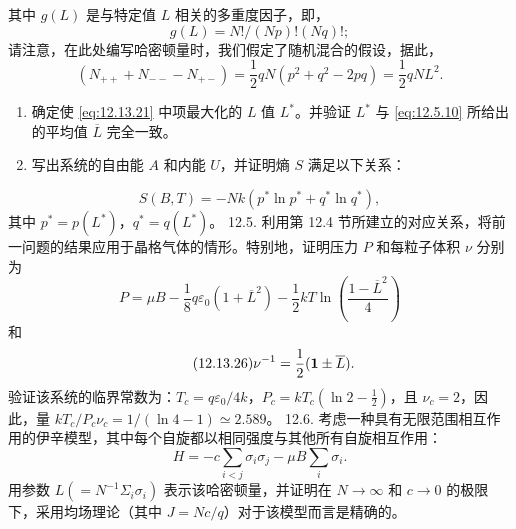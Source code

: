 其中 \(g(L)\) 是与特定值 \(L\) 相关的多重度因子，即，
\begin{equation}\tag{12.13.22}\label{eq:12.13.22}
g ( L ) = N ! / ( N p ) ! ( N q ) ! ;
\end{equation}
请注意，在此处编写哈密顿量时，我们假定了随机混合的假设，据此，
\begin{equation}\tag{12.13.23}\label{eq:12.13.23}
( N _ { + + } + N _ { -- } - N _ { + - } ) = \frac { 1 } { 2 } q N ( p ^{2} + q ^{2} - 2 p q ) = \frac { 1 } { 2 } q N L ^{2} .
\end{equation}
\begin{enumerate}
\def\labelenumi{(\alph{enumi})}
\item
  确定使 \autoref{eq:12.13.21} 中项最大化的 \(L\) 值 \(L^{*}\)。并验证 \(L^{*}\) 与 \autoref{eq:12.5.10} 所给出的平均值 \(\overline{L}\) 完全一致。
\item
  写出系统的自由能 \(A\) 和内能 \(U\)，并证明熵 \(S\) 满足以下关系：
\end{enumerate}
\begin{equation}\tag{12.13.24}\label{eq:12.13.24}
S ( B , T ) = - N k ( p ^{*} \ln p ^{*} + q ^{*} \ln q ^{*} ) ,
\end{equation}
其中 \(p^{*}=p(L^{*})\)，\(q^{*}=q(L^{*})\)。
12.5. 利用第 12.4 节所建立的对应关系，将前一问题的结果应用于晶格气体的情形。特别地，证明压力 \(P\) 和每粒子体积 \(\nu\) 分别为
\begin{equation}\tag{12.13.25}\label{eq:12.13.25}
P = \mu B - \frac { 1 } { 8 } q \varepsilon _ { 0 } \left( 1 + \overline { { { L } } } ^{2} \right) - \frac { 1 } { 2 } k T \ln \left( \frac { 1 - \overline { { { L } } } ^{2} } { 4 } \right)
\end{equation}
和
\begin{equation}\tag{12.13.26}\label{eq:12.13.26}
\nu ^{- 1} = \frac { 1 } { 2 } ( { \bf 1 } \pm \overline { { { L } } } ) .
\end{equation}
验证该系统的临界常数为：\(T_{c}=q\varepsilon_{0}/4k\)，\(P_{c}=kT_{c}(\ln2-\frac{1}{2})\)，且 \(\nu_{c}=2\)，因此，量 \(kT_{c}/P_{c}\nu_{c}=1/(\ln4-1)\simeq2.589\)。
12.6. 考虑一种具有无限范围相互作用的伊辛模型，其中每个自旋都以相同强度与其他所有自旋相互作用：
\begin{equation}\tag{12.13.27}\label{eq:12.13.27}
H = - c \sum _ { i < j } \sigma _ { i } \sigma _ { j } - \mu B \sum _ { i } \sigma _ { i } .
\end{equation}
用参数 \(L(=N^{-1}\Sigma_{i}\sigma_{i})\) 表示该哈密顿量，并证明在 \(N\to\infty\) 和 \(c\to0\) 的极限下，采用均场理论（其中 \(J=Nc/q\)）对于该模型而言是精确的。
